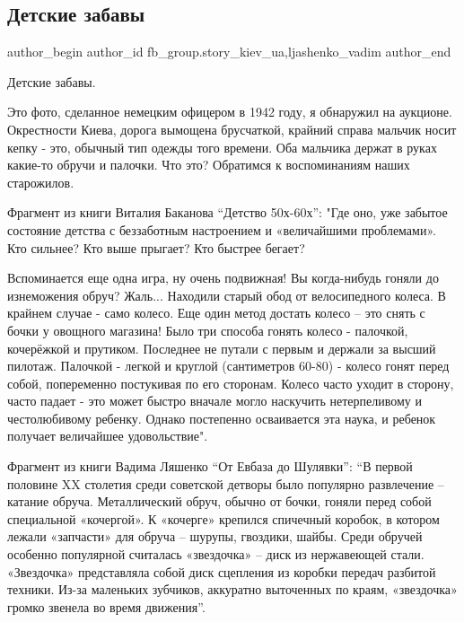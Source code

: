  
 
 
 
 
 
\subsection{Детские забавы}
\label{sec:20_01_2022.fb.fb_group.story_kiev_ua.1.detstkie_zabavy}
 
\ifcmt
 author_begin
   author_id fb_group.story_kiev_ua,ljashenko_vadim
 author_end
\fi

Детские забавы. 

Это фото, сделанное немецким офицером в 1942 году, я обнаружил на аукционе.
Окрестности Киева, дорога вымощена брусчаткой, крайний справа мальчик носит
кепку - это, обычный тип одежды того времени. Оба мальчика держат в руках
какие-то обручи и палочки. Что это? Обратимся к воспоминаниям наших старожилов.


Фрагмент из книги Виталия Баканова \enquote{Детство 50х-60х}: "Где оно, уже забытое
состояние детства с беззаботным настроением и «величайшими проблемами». Кто
сильнее? Кто выше прыгает? Кто быстрее бегает?

Вспоминается еще одна игра, ну очень подвижная! Вы когда-нибудь гоняли до
изнеможения обруч? Жаль... Находили старый обод от велосипедного колеса. В
крайнем случае -  само колесо.  Еще один метод достать колесо – это снять с
бочки у овощного магазина! Было три способа гонять колесо - палочкой,
кочерёжкой и прутиком. Последнее не путали с первым и держали за высший
пилотаж. Палочкой - легкой и круглой (сантиметров 60-80) - колесо гонят перед
собой, попеременно постукивая по его сторонам. Колесо часто уходит в сторону,
часто падает - это может быстро вначале могло наскучить нетерпеливому и
честолюбивому ребенку. Однако постепенно осваивается эта наука, и ребенок
получает величайшее удовольствие".

Фрагмент из книги Вадима Ляшенко \enquote{От Евбаза до Шулявки}: \enquote{В первой половине XX
столетия среди советской детворы было популярно развлечение – катание обруча.
Металлический обруч, обычно от бочки, гоняли перед собой специальной
«кочергой». К «кочерге» крепился спичечный коробок, в котором лежали «запчасти»
для обруча – шурупы, гвоздики, шайбы. Среди обручей особенно популярной
считалась «звездочка» – диск из нержавеющей стали. «Звездочка» представляла
собой диск сцепления из коробки передач разбитой техники. Из-за маленьких
зубчиков, аккуратно выточенных по краям, «звездочка» громко звенела во время
движения}.
